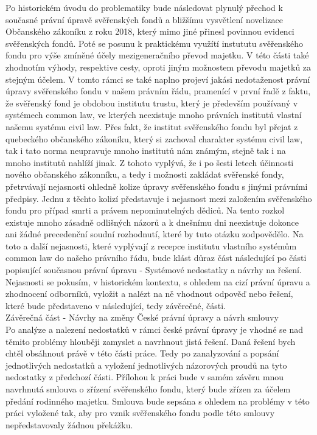 \documentclass{article}
\begin{document}
Po historickém úvodu do problematiky bude následovat plynulý přechod k současné právní úpravě svěřenských fondů a bližšímu vysvětlení novelizace Občanského zákoníku z roku 2018, který mimo jiné přinesl povinnou evidenci svěřenských fondů. Poté se posunu k praktickému využítí instututu svěřenského fondu pro výše zmíněné účely mezigeneračního převod majetku. V této části také zhodnotím výhody, respektive cesty, oproti jiným možnostem převodu majetků za stejným účelem. V tomto rámci se také naplno projeví jakási nedotaženost právní úpravy svěřenského fondu v našem právním řádu, pramenící v první řadě z faktu, že svěřenský fond je obdobou institutu trustu, který je především používaný v systémech common law, ve kterých neexistuje mnoho právních institutů vlastní našemu systému civil law. Přes fakt, že institut svěřenského fondu byl přejat z quebeckého občanského zákoníku, který si zachoval charakter systému civil law, tak i tato norma neupravuje mnoho institutů nám známým, stejně tak i na mnoho institutů nahlíží jinak. Z tohoto vyplývá, že i po šesti letech účinnosti nového občanského zákonníku, a tedy i možnosti zakládat svěřenské fondy, přetrvávají nejasnosti ohledně kolize úpravy svěřenského fondu s jinými právními předpisy. Jednu z těchto kolizí představuje i nejasnost mezi založením svěřenského fondu pro případ smrti a právem nepominutelných dědiců. Na tento rozkol existuje mnoho zásadně odlišných názorů a k dnešnímu dni neexistuje dokonce ani žádné precedenční soudní rozhodnutí, které by tuto otázku zodpovědělo. Na toto a další nejasnosti, které vyplývají z recepce institutu vlastního systémům common law do našeho právního řádu, bude klást důraz část následující po části popisující současnou právní úpravu - Systémové nedostatky a návrhy na řešení. Nejasnosti se pokusím, v historickém kontextu, s ohledem na cizí právní úpravu a zhodnocení odborníků, vyložit a nalézt na ně vhodnout odpověď nebo řešení, které bude představeno v následující, tedy závěrečné, části. \\

{\Large Závěrečná část - Návrhy na změny České právní úpravy a návrh smlouvy}\\


Po analýze a nalezení nedostatků v rámci české právní úpravy je vhodné se nad těmito problémy hlouběji zamyslet a navrhnout jistá řešení. Daná řešení bych chtěl obsáhnout právě v této části práce. Tedy po zanalyzování a popsání jednotlivých nedostatků a vyložení jednotlivých názorových proudů na tyto nedostatky z předchozí části. Přílohou k práci bude v samém závěru mnou navrhnutá smlouva o zřízení svěřenského fondu, který bude zřízen za účelem předání rodinného majetku. Smlouva bude sepsána s ohledem na problémy v této práci vyložené tak, aby pro vznik svěřenského fondu podle této smlouvy nepředstavovaly žádnou překážku.
\end{document}
